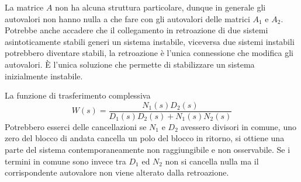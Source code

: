 La matrice $A$ non ha alcuna struttura particolare, dunque in generale gli
autovalori non hanno nulla a che fare con gli autovalori delle matrici $A_1$ e
$A_2$. Potrebbe anche accadere che il collegamento in retroazione di due
sistemi asintoticamente stabili generi un sistema instabile, viceversa due
sistemi instabili potrebbero diventare stabili, la retroazione è l'unica
connessione che modifica gli autovalori.
È l'unica soluzione che permette di stabilizzare un sistema inizialmente
instabile.

La funzione di trasferimento complessiva
$$
W(s) = \frac{N_1(s) D_2(s)}{D_1(s)D_2(s)+N_1(s)N_2(s)}
$$
Potrebbero esserci delle cancellazioni se $N_1$ e $D_2$ avessero divisori in
comune, uno zero del blocco di andata cancella un polo del blocco in ritorno,
si ottiene una parte del sistema contemporaneamente non raggiungibile e non
osservabile.
Se i termini in comune sono invece tra $D_1$ ed $N_2$ non si cancella nulla ma
il corrispondente autovalore non viene alterato dalla retroazione.
